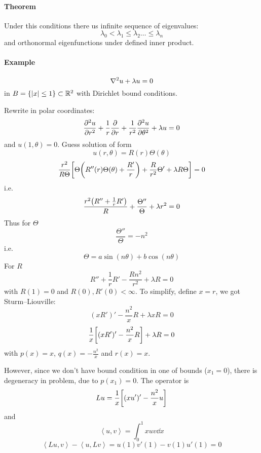 \paragraph{Theorem}
Under this conditions there us infinite sequence of eigenvalues:
$$\lambda_0 < \lambda_1 \leq \lambda_2 \dots \leq \lambda_n$$
and orthonormal eigenfunctions under defined inner product.
\paragraph{Example}
$$
\laplacian{u} + \lambda u = 0
$$
in $B =\qty{ \abs{x} \leq 1 } \subset \mathbb{R}^2 $ with Dirichlet bound conditions.

Rewrite in polar coordinates:
$$\pdv[2]{u}{r} + \frac{1}{r} \pdv{r} + \frac{1}{r^2} \pdv[2]{u}{\theta} +\lambda u = 0$$
and $u(1,\theta) = 0$. Guess solution of form
$$u(r,\theta) = R(r)\Theta(\theta)$$
$$\frac{r^2}{R\Theta}\qty[ \Theta \qty(R''(r) \Theta(\theta) + \frac{R'}{r})+ \frac{R}{r^2}\Theta' + \lambda R\Theta ] = 0$$
i.e.
$$\frac{r^2 \qty(R''+\frac{1}{r}R')}{R} + \frac{\Theta''}{\Theta} + \lambda r^2 = 0$$
Thus for $\Theta$
$$\frac{\Theta''}{\Theta} = -n^2$$
i.e.
$$\Theta = a\sin(n\theta) + b\cos(n\theta)$$
For $R$
$$R'' + \frac{1}{r} R' - \frac{Rn^2}{r^2} + \lambda R = 0$$
with $R(1)=0$ and $R(0),R'(0) < \infty$.
To simplify, define $x=r$, we got Sturm–Liouville:
$$(xR')' - \frac{n^2}{x}R + \lambda xR = 0$$
$$\frac{1}{x}\qty[(xR')' - \frac{n^2}{x}R] + \lambda R = 0$$
with $p(x) = x$, $q(x) = -\frac{n^2}{x}$ and $r(x) = x$.

However, since we don't have bound condition in one of bounds ($x_1=0$), there is degeneracy in problem, due to $p(x_1)=0$. The operator is
$$Lu = \frac{1}{x} \qty[(xu')'-\frac{n^2}{x}u]$$
and
$$\left\langle u,v \right\rangle = \int_0^1 xuv \dd{x}$$
$$\left\langle Lu,v \right\rangle - \left\langle u,Lv \right\rangle = u(1)v'(1) - v(1) u'(1) = 0$$
